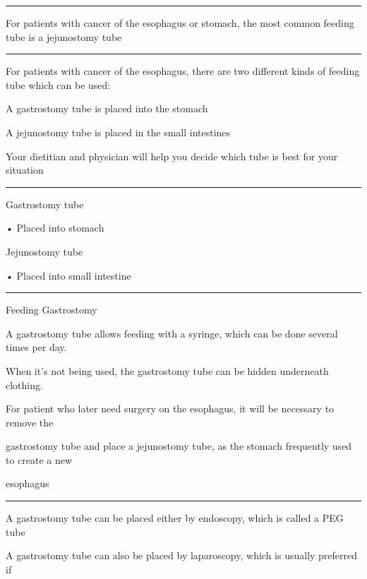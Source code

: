 \documentclass[
]{article}
\begin{document}
\begin{center}\rule{0.5\linewidth}{0.5pt}\end{center}

For patients with cancer of the esophagus or stomach, the most common
feeding tube is a jejunostomy tube

\begin{center}\rule{0.5\linewidth}{0.5pt}\end{center}

For patients with cancer of the esophagus, there are two different kinds
of feeding tube which can be used:

A gastrostomy tube is placed into the stomach

A jejunostomy tube is placed in the small intestines

Your dietitian and physician will help you decide which tube is best for
your situation

\begin{center}\rule{0.5\linewidth}{0.5pt}\end{center}

Gastrostomy tube

• Placed into stomach

Jejunostomy tube

• Placed into small intestine

\begin{center}\rule{0.5\linewidth}{0.5pt}\end{center}

Feeding Gastrostomy

A gastrostomy tube allows feeding with a syringe, which can be done
several times per day.

When it's not being used, the gastrostomy tube can be hidden underneath
clothing.

For patient who later need surgery on the esophagus, it will be
necessary to remove the

gastrostomy tube and place a jejunostomy tube, as the stomach frequently
used to create a new

esophagus

\begin{center}\rule{0.5\linewidth}{0.5pt}\end{center}

A gastrostomy tube can be placed either by endoscopy, which is called a
PEG tube

A gastrostomy tube can also be placed by laparoscopy, which is usually
preferred if
\end{document}
